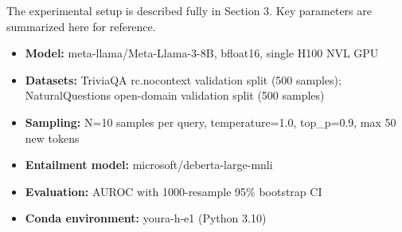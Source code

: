 
The experimental setup is described fully in Section 3. Key parameters are summarized here for reference.

\begin{itemize}
\item \textbf{Model:} meta-llama/Meta-Llama-3-8B, bfloat16, single H100 NVL GPU
\item \textbf{Datasets:} TriviaQA rc.nocontext validation split (500 samples); NaturalQuestions open-domain validation split (500 samples)
\item \textbf{Sampling:} N=10 samples per query, temperature=1.0, top_p=0.9, max 50 new tokens
\item \textbf{Entailment model:} microsoft/deberta-large-mnli
\item \textbf{Evaluation:} AUROC with 1000-resample 95\% bootstrap CI
\item \textbf{Conda environment:} youra-h-e1 (Python 3.10)
\end{itemize}

